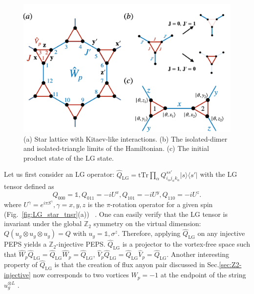 \documentclass{ntuthesis}
\newcommand{\citep}{\cite}
\begin{document}
\begin{figure}[t]
\centering
\includegraphics[width=\linewidth]{star_LG}
\caption{ (a) Star lattice with Kitaev-like interactions.  (b) The isolated-dimer and isolated-triangle limits of the Hamiltonian. (c) The initial product state of the LG state.}
\label{fig:star_lattice}
\end{figure}

Let us first consider an LG operator: $\hat{Q}_{\text{LG}} = \text{tTr}\prod_\alpha {Q}^{ss'}_{i_\alpha j_\alpha k_\alpha}|s\rangle \langle s'| $ with the LG tensor defined as
\begin{equation}
Q_{000} = \mathbb{1}, Q_{011} = -iU^x, Q_{101} = -iU^y, Q_{110} = -iU^z.
\end{equation}
where $U^\gamma = e^{i \pi S^\gamma}, \gamma =x,y,z$ is the $\pi$-rotation operator for a given spin (Fig.~\ref{fig:LG_star_tnsr}(a)) ~\cite{lee2020anisotropy}. 
%
One can easily verify that the LG tensor is invariant under the global $\mathbb{Z}_2$ symmetry on the virtual dimension: $Q(u_g \otimes u_g \otimes u_g) = Q $ with $u_g = \mathbb{1}, {\sigma}^z$.
%
Therefore, applying $\hat{Q}_{\text{LG}}$ on any injective PEPS yields a $\mathbb{Z}_2$-injective PEPS. 
%
 $\hat{Q}_{\text{LG}}$ is a projector to the vortex-free space such that $\hat{W}_p\hat{Q}_{\text{LG}} = \hat{Q}_{\text{LG}}\hat{W}_p = \hat{Q}_{\text{LG}}$, $\hat{V}_p\hat{Q}_{\text{LG}} = \hat{Q}_{\text{LG}}\hat{V}_p = \hat{Q}_{\text{LG}}$.
%
Another interesting property of $\hat{Q}_{\text{LG}}$ is that the creation of flux anyon pair discussed in Sec.\ref{sec:Z2-injective} now corresponds to two vortices $W_p = -1$ at the endpoint of the string $u_g^{\otimes L}$ \citep{spin_one_half}.
\end{document}
